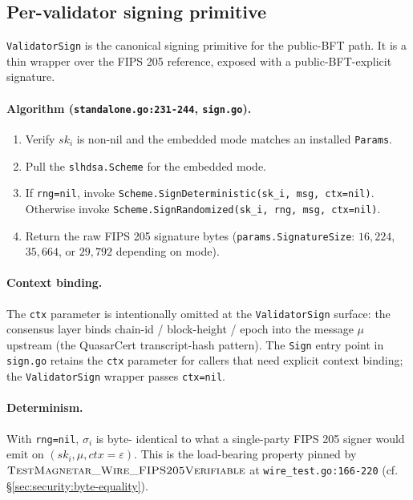 \subsection{Per-validator signing primitive}
\label{sec:construction:sign}

\texttt{ValidatorSign} is the canonical signing primitive for the
public-BFT path. It is a thin wrapper over the FIPS 205 reference,
exposed with a public-BFT-explicit signature.

\paragraph{Algorithm (\texttt{standalone.go:231-244}, \texttt{sign.go}).}
\begin{enumerate}[leftmargin=2em,nosep]
  \item Verify $sk_i$ is non-nil and the embedded mode matches an
        installed \texttt{Params}.
  \item Pull the \texttt{slhdsa.Scheme} for the embedded mode.
  \item If \texttt{rng=nil}, invoke
        \texttt{Scheme.SignDeterministic(sk\_i, msg, ctx=nil)}.
        Otherwise invoke
        \texttt{Scheme.SignRandomized(sk\_i, rng, msg, ctx=nil)}.
  \item Return the raw FIPS 205 signature bytes
        (\texttt{params.SignatureSize}: $16{,}224$, $35{,}664$, or
        $29{,}792$ depending on mode).
\end{enumerate}

\paragraph{Context binding.} The \texttt{ctx} parameter is
intentionally omitted at the \texttt{ValidatorSign} surface: the
consensus layer binds chain-id / block-height / epoch into the
message $\mu$ upstream (the QuasarCert transcript-hash pattern).
The \texttt{Sign} entry point in \texttt{sign.go} retains the
\texttt{ctx} parameter for callers that need explicit context
binding; the \texttt{ValidatorSign} wrapper passes
\texttt{ctx=nil}.

\paragraph{Determinism.} With \texttt{rng=nil}, $\sigma_i$ is byte-
identical to what a single-party FIPS 205 signer would emit on
$(sk_i, \mu, \mathit{ctx}=\varepsilon)$. This is the load-bearing
property pinned by
$\textsc{TestMagnetar\_Wire\_FIPS205Verifiable}$ at
\texttt{wire\_test.go:166-220} (cf. \S\ref{sec:security:byte-equality}).

